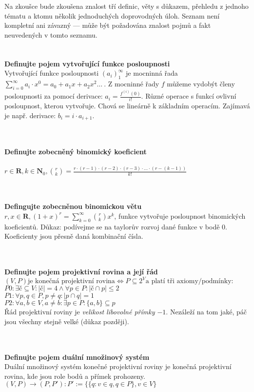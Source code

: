 \documentclass[a4paper]{article}
\newcommand{\hlava}[1]{\text{} \\ \text{} \\ \text{} \hspace{-0.27cm} \textbf{#1} \\}
\newcommand{\str}[1]{\hspace{0.05cm} \fbox{s. #1} }
\begin{document}
\text{}\vspace{-0.1cm}
{\fontsize{12}{15}\selectfont \hspace{-0.14cm}}
\\\\
Na zkoušce bude zkoušena znalost tří definic, věty s důkazem, přehledu z jednoho tématu a ktomu několik jednoduchých doprovodných úloh. Seznam není kompletní ani závazný --- může být požadována znalost pojmů a fakt neuvedených v tomto seznamu.\\
\hlava{Definujte pojem vytvořující funkce posloupnosti}

Vytvořující funkce posloupnosti $(a_i)_1^\infty$ je mocninná řada $\sum_{i=0}^\infty a_i\cdot x^0  = a_0 + a_1 x  + a_2 x^2 \dots \ $. Z mocninné řady $f$ můžeme vydobýt členy posloupnosti za pomocí derivace: $a_i = \frac{f^{(i)}(0)}{i!}$. Různé operace s funkcí ovlivní posloupnost, kterou vytvořuje. Chová se lineárně k základním operacím. Zajímavá je např. derivace: $b_i = i\cdot  a_{i+1}$.
\str{4} 

\hlava{Definujte zobecněný binomický koeficient}\\
$r \in \mathbf{R}, k \in \mathbf{N}_0, { r \choose k} = \frac{r\cdot (r-1) \cdot (r-2) \cdot (r-3) \cdot \dots \cdot (r-(k-1))}{k!}$
\str{4}

\hlava{Defingujte zobecněnou binomickou větu}
$r,x \in \mathbf{R}, (1+x)^r = \sum_{k=0}^\infty {r \choose k} x^k$, funkce vytvořuje posloupnost binomických koeficientů. Důkaz: podívejme se na taylorův rozvoj dané funkce v bodě 0. Koeficienty jsou přesně daná kombinační čísla.
\str{4}

\hlava{Definujte pojem projektivní rovina a její řád}
$(V, P) \text{je konečná projektivní rovina} \Leftrightarrow P \subseteq 2^V \text{a platí tři axiomy/podmínky:}$ \\
$ P0: \exists \text{č}\subseteq V: |\text{č}|=4 \wedge \forall p \in P: |\text{č} \cap p| \le 2 $ \\
$ P1: \forall p,q \in P, p \ne q: |p \cap q| = 1 $ \\
$ P2: \forall a,b \in V, a \ne b: \exists p \in P: \{a,b\} \subseteq p$ \\
Řád projektivní roviny je \textit{velikost libovolné přímky $-1$}. Nezáleží na tom jaké, páč jsou všechny stejně velké (důkaz později). \str{7}

\hlava{Definujte pojem duální množinový systém}
Duální množinový systém konečné projektivní roviny je konečná projektivní rovina, kde jsou role bodů a přímek prohozeny.
$(V,P) \rightarrow (P, P'): P':= \{ \{q: v \in q, q \in P \}, v \in V\}$ \str{9}
\end{document}
